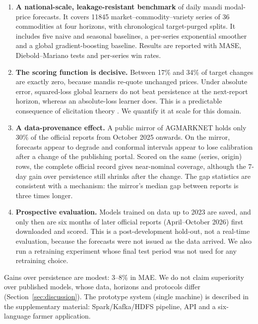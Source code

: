 \begin{enumerate}
  \item \textbf{A national-scale, leakage-resistant benchmark} of daily mandi modal-price forecasts.
    It covers \num{11845} market--commodity--variety series of 36 commodities at four horizons, with chronological target-purged splits.
    It includes five naive and seasonal baselines, a per-series exponential smoother and a global gradient-boosting baseline.
    Results are reported with MASE, Diebold--Mariano tests and per-series win rates.
  \item \textbf{The scoring function is decisive.} Between 17\% and 34\% of target changes are exactly zero, because mandis re-quote unchanged prices.
    Under absolute error, squared-loss global learners do not beat persistence at the next-report horizon, whereas an absolute-loss learner does.
    This is a predictable consequence of elicitation theory \cite{gneiting2011making}. We quantify it at scale for this domain.
  \item \textbf{A data-provenance effect.} A public mirror of AGMARKNET holds only 30\% of the official reports from October 2025 onwards.
    On the mirror, forecasts appear to degrade and conformal intervals appear to lose calibration after a change of the publishing portal.
    Scored on the same (series, origin) rows, the complete official record gives near-nominal coverage, although the 7-day gain over persistence still shrinks after the change. The gap statistics are consistent with a mechanism: the mirror's median gap between reports is three times longer.
  \item \textbf{Prospective evaluation.} Models trained on data up to 2023 are saved, and only then are six months of later official reports (April--October 2026) first downloaded and scored. This is a post-development hold-out, not a real-time evaluation, because the forecasts were not issued as the data arrived. We also run a retraining experiment whose final test period was not used for any retraining choice.
\end{enumerate}

Gains over persistence are modest: 3--8\% in MAE. We do not claim superiority over published models, whose data, horizons and protocols differ (Section~\ref{sec:discussion}).
The prototype system (single machine) is described in the supplementary material: Spark/Kafka/HDFS pipeline, API and a six-language farmer application.
